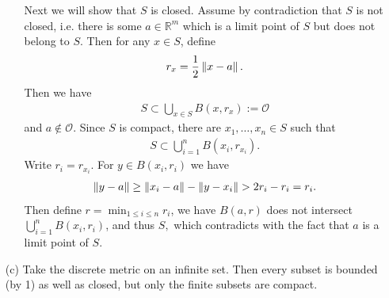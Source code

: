 \begin{problem}
\begin{solution}
\begin{itemize}
\begin{itemize}
        Next we will show that $S$ is closed. Assume by contradiction that $S$ is not closed, i.e. there is some $a\in\mathbb{R}^m$ which is a limit point of $S$ but does not belong to $S.$ Then for any $x\in S$, define 
        \begin{align*}
            r_x=\dfrac{1}{2}\norm{x-a}.
        \end{align*}
        Then we have 
        \begin{align*}
            S\subset \bigcup_{x\in S}B(x,r_x):=\mathcal{O}
        \end{align*}
        and $a\notin \mathcal{O}.$ Since $S$ is compact, there  are $x_1,\ldots,x_n\in S$ such that \begin{align*}
            S\subset \bigcup_{i=1}^nB(x_i,r_{x_i}).
        \end{align*}
        Write $r_i=r_{x_i}$. For $y\in B(x_i,r_i)$ we have
        \begin{align*}
            \norm{y-a}\geq\norm{x_i-a}-\norm{y-x_i}>2r_i-r_i=r_i.
        \end{align*}
        Then define $r=\min_{1\le i\le n} r_i$, we have $B(a,r)$ does not intersect $\bigcup_{i=1}^nB(x_i,r_i)$, and thus $S,$ which contradicts with the fact that $a$ is a limit point of $S.$
     \end{itemize}
    \item[(c)] Take the discrete metric on an infinite set. Then every subset is bounded (by 1) as well as closed, but only the finite subsets are compact. 
\end{itemize}
\end{solution}
\end{problem}

